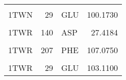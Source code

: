 \begin{table}
\begin{tabular}{lrlr}
			\addlinespace
			\cellcolor{gray!6}{1TWN} & \cellcolor{gray!6}{25} & \cellcolor{gray!6}{HIS} & \cellcolor{gray!6}{113.5160}\\
			1TWN & 29 & GLU & 100.1730\\
			\cellcolor{gray!6}{1TWR} & \cellcolor{gray!6}{138} & \cellcolor{gray!6}{LEU} & \cellcolor{gray!6}{75.0669}\\
			1TWR & 140 & ASP & 27.4184\\
			\cellcolor{gray!6}{1TWR} & \cellcolor{gray!6}{142} & \cellcolor{gray!6}{SER} & \cellcolor{gray!6}{129.2760}\\
			\addlinespace
			1TWR & 207 & PHE & 107.0750\\
			\cellcolor{gray!6}{1TWR} & \cellcolor{gray!6}{25} & \cellcolor{gray!6}{HIS} & \cellcolor{gray!6}{108.8640}\\
			1TWR & 29 & GLU & 103.1100\\
			\bottomrule
		\end{tabular}
	\end{table}

